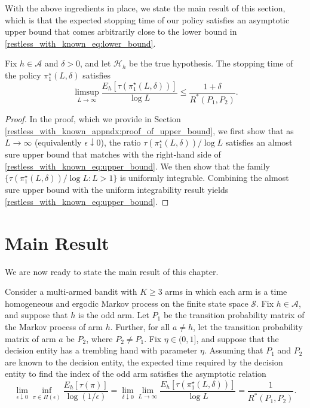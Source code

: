 With the above ingredients in place, we state the main result of this section, which is that the expected stopping time of our policy satisfies an asymptotic upper bound that comes arbitrarily close to the lower bound in \eqref{restless_with_known_eq:lower_bound}.
\begin{prop}\label{restless_with_known_prop:upper_bound}
	Fix $h\in\mathcal{A}$ and $\delta>0$, and let $\mathcal{H}_h$ be the true hypothesis. The stopping time of the policy $\pi_1^\star(L, \delta)$ satisfies
	\begin{equation}
		\limsup\limits_{L\to\infty}\frac{E_h[\tau(\pi_1^\star(L, \delta))]}{\log L}\leq \frac{1+\delta}{R^*(P_1,P_2)}.\label{restless_with_known_eq:upper_bound}
	\end{equation}
\end{prop}
\begin{proof}
In the proof, which we provide in Section \ref{restless_with_known_appndx:proof_of_upper_bound}, we first show that as $L\to\infty$ (equivalently $\epsilon\downarrow 0$), the ratio $\tau(\pi_1^\star(L, \delta))/\log L$ satisfies an almost sure upper bound that matches with the right-hand side of \eqref{restless_with_known_eq:upper_bound}. We then show that the family $\{\tau(\pi_1^\star(L, \delta))/\log L:L>1\}$ is uniformly integrable. Combining the almost sure upper bound with the uniform integrability result yields \eqref{restless_with_known_eq:upper_bound}.
\end{proof}

\section{Main Result}\label{restless_with_known_sec:main_result}
We are now ready to state the main result of this chapter.

\begin{theorem}\label{restless_with_known_prop:main_result}
	Consider a multi-armed bandit with $K\geq 3$ arms in which each arm is a time homogeneous and ergodic Markov process on the finite state space $\mathcal{S}$. Fix $h\in\mathcal{A}$, and suppose that $h$ is the odd arm. Let $P_1$ be the transition probability matrix of the Markov process of arm $h$. Further, for all $a\neq h$, let the transition probability matrix of arm $a$ be $P_2$, where $P_2\neq P_1$. Fix $\eta\in (0,1]$, and suppose that the decision entity has a trembling hand with parameter $\eta$. Assuming that $P_1$ and $P_2$ are known to the decision entity, the expected time required by the decision entity to find the index of the odd arm satisfies the asymptotic relation
	\begin{equation}
		\lim\limits_{\epsilon\downarrow 0}\inf\limits_{\pi\in\Pi(\epsilon)}\frac{E_h[\tau(\pi)]}{\log(1/\epsilon)}=\lim\limits_{\delta \downarrow 0}\lim\limits_{L\to\infty}\frac{E_h[\tau(\pi_1^\star(L,\delta))]}{\log L}= \frac{1}{R^*(P_1,P_2)}.\label{restless_with_known_eq:main_result}
	\end{equation}
\end{theorem}


